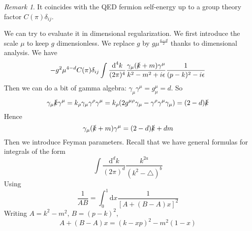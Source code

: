 \documentclass[a4paper]{book}
\theoremstyle{definition}
\theoremstyle{remark}
\newtheorem*{remark}{Remark}
\begin{document}
\begin{remark}
    It coincides with the QED fermion self-energy up to a group theory factor $C(\pi)\delta_{ij}$.
\end{remark}

We can try to evaluate it in dimensional regularization. We first introduce the scale $\mu$ to keep $g$ dimensionless. We replace $g$ by $g\mu^{\frac{4-d}{2}}$ thanks to dimensional analysis. We have 
\begin{equation}
    -g^2 \mu^{4-d}C(\pi)\delta_{ij} \int \frac{\text{d}^4k}{(2\pi)^4}  \frac{\gamma_\mu (\slashed{k} + m)\gamma^\mu}{k^2 - m^2 + i\epsilon } \frac{1}{(p-k)^2 - i\epsilon} 
\end{equation}
Then we can do a bit of gamma algebra: $\gamma_\mu \gamma^\mu = g^\mu_\mu = d$. So 
\begin{equation}
    \gamma_\mu \slashed{k} \gamma^\mu = k_\rho \gamma_\mu \gamma^\rho \gamma^\mu = k_\rho(2g^{\mu\rho}\gamma_\mu-\gamma^\rho \gamma^\mu\gamma_\mu) = (2-d)\slashed{k}
\end{equation}
Hence
\begin{equation}
    \gamma_\mu (\slashed{k} + m) \gamma^\mu = (2-d)\slashed{k} + dm
\end{equation}
Then we introduce Feyman parameters. Recall that we have general formulas for integrals of the form 
\begin{equation}
    \int \frac{\text{d}^d k}{(2\pi)^d} \frac{k^{2a}}{(k^2 - \triangle)^b}
\end{equation}
Using 
\begin{equation}
    \frac{1}{AB} = \int_0^1 \text{d}x \frac{1}{[A + (B-A)x]^2}
\end{equation}
Writing $A = k^2 - m^2$, $B = (p-k)^2$, 
\begin{equation}
    A + (B-A)x = (k-xp)^2 - m^2 (1-x)
\end{equation}
\end{document}

